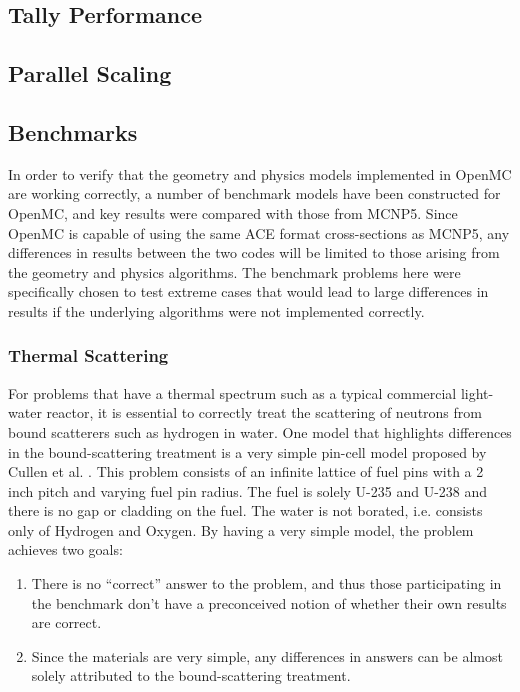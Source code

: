 \documentclass{elsarticle}
\begin{document}
\subsection{Tally Performance}

\subsection{Parallel Scaling}

\subsection{Benchmarks}

In order to verify that the geometry and physics models implemented in OpenMC
are working correctly, a number of benchmark models have been constructed for
OpenMC, and key results were compared with those from MCNP5. Since OpenMC is
capable of using the same ACE format cross-sections as MCNP5, any differences in
results between the two codes will be limited to those arising from the geometry
and physics algorithms. The benchmark problems here were specifically chosen to
test extreme cases that would lead to large differences in results if the
underlying algorithms were not implemented correctly.

\subsubsection{Thermal Scattering}

For problems that have a thermal spectrum such as a typical commercial
light-water reactor, it is essential to correctly treat the scattering of
neutrons from bound scatterers such as hydrogen in water. One model that
highlights differences in the bound-scattering treatment is a very simple
pin-cell model proposed by Cullen et al. \cite{pincell}. This problem consists
of an infinite lattice of fuel pins with a 2 inch pitch and varying fuel pin
radius. The fuel is solely U-235 and U-238 and there is no gap or cladding on
the fuel. The water is not borated, i.e. consists only of Hydrogen and
Oxygen. By having a very simple model, the problem achieves two goals:
\begin{enumerate}
  \item There is no ``correct'' answer to the problem, and thus those
    participating in the benchmark don't have a preconceived notion of whether
    their own results are correct.
  \item Since the materials are very simple, any differences in answers can be
    almost solely attributed to the bound-scattering treatment.
\end{enumerate}
\end{document}
